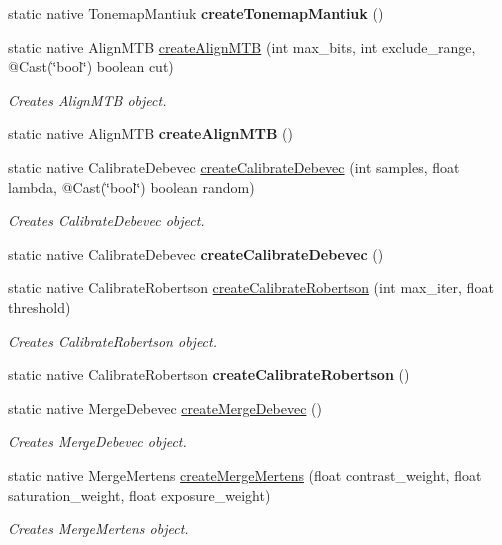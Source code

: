 \begin{DoxyCompactItemize}
static native Tonemap\+Mantiuk {\bfseries create\+Tonemap\+Mantiuk} ()
\item 
static native Align\+M\+TB \hyperlink{group__photo__hdr_ga07eeedb34057b6d4d7c8679fda18175f}{create\+Align\+M\+TB} (int max\+\_\+bits, int exclude\+\_\+range, @Cast(\char`\"{}bool\char`\"{}) boolean cut)
\begin{DoxyCompactList}\small\item\em Creates Align\+M\+TB object. \end{DoxyCompactList}\item 
static native Align\+M\+TB {\bfseries create\+Align\+M\+TB} ()
\item 
static native Calibrate\+Debevec \hyperlink{group__photo__hdr_gada8b25f072e80141d53f66754675dbec}{create\+Calibrate\+Debevec} (int samples, float lambda, @Cast(\char`\"{}bool\char`\"{}) boolean random)
\begin{DoxyCompactList}\small\item\em Creates Calibrate\+Debevec object. \end{DoxyCompactList}\item 
static native Calibrate\+Debevec {\bfseries create\+Calibrate\+Debevec} ()
\item 
static native Calibrate\+Robertson \hyperlink{group__photo__hdr_ga1ac32f0f1042b3436bd7daf88bb48760}{create\+Calibrate\+Robertson} (int max\+\_\+iter, float threshold)
\begin{DoxyCompactList}\small\item\em Creates Calibrate\+Robertson object. \end{DoxyCompactList}\item 
static native Calibrate\+Robertson {\bfseries create\+Calibrate\+Robertson} ()
\item 
static native Merge\+Debevec \hyperlink{group__photo__hdr_ga90dac3606f6344e591968df25cd8ace6}{create\+Merge\+Debevec} ()
\begin{DoxyCompactList}\small\item\em Creates Merge\+Debevec object. \end{DoxyCompactList}\item 
static native Merge\+Mertens \hyperlink{group__photo__hdr_ga7f47cc9c6b5e72f9fbf7281271dfc426}{create\+Merge\+Mertens} (float contrast\+\_\+weight, float saturation\+\_\+weight, float exposure\+\_\+weight)
\begin{DoxyCompactList}\small\item\em Creates Merge\+Mertens object. \end{DoxyCompactList}\item 

\end{DoxyCompactItemize}
